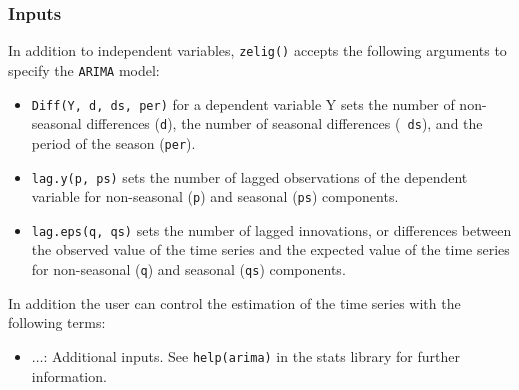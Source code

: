 \subsubsection*{Inputs}
In addition to independent variables, {\tt zelig()} accepts the
following arguments to specify the {\tt ARIMA} model:
\begin{itemize}
\item {\tt Diff(Y, d, ds, per)} for a dependent variable Y sets the
number of non-seasonal differences ({\tt d}), the number of seasonal differences ({\tt
ds}), and the period of the season ({\tt per}).
\item {\tt lag.y(p, ps)} sets the number of lagged observations of the
dependent variable for non-seasonal ({\tt p}) and seasonal ({\tt ps})
components.
\item {\tt lag.eps(q, qs)} sets the number of lagged innovations, or
differences between the observed value of the time series and the
expected value of the time series for non-seasonal ({\tt q}) and
seasonal ({\tt qs}) components.  
\end{itemize}
In addition the user can control the estimation of the time
series with the following terms: 
\begin{itemize}
\item $\hdots$: Additional inputs.  See {\tt help(arima)} in the stats
library for further information.
\end{itemize}
  
